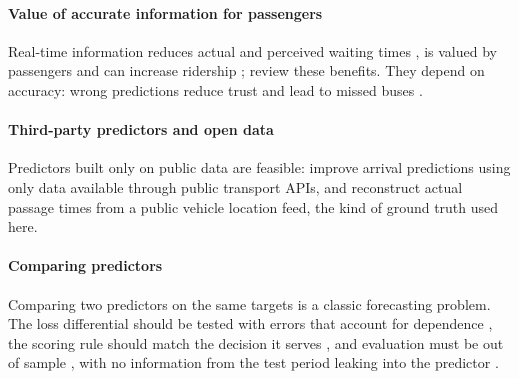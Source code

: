 \paragraph{Value of accurate information for passengers} Real-time information reduces actual and perceived waiting
times \parencite{watkins2011,dziekan2007dynamic,mishalani2006,liu2020waiting}, is valued by passengers
\parencite{ferris2010onebusaway,rahman2013users} and can increase ridership \parencite{tang2012chicago,brakewood2015nyc};
\textcite{brakewood2019} review these benefits. They depend on accuracy: wrong predictions reduce trust and lead to missed
buses \parencite{gooze2013benefits}.

\paragraph{Third-party predictors and open data} Predictors built only on public data are feasible:
\textcite{garciamaurino2024improving} improve arrival predictions using only data available through public transport
APIs, and \textcite{wessel2017retrospective} reconstruct actual passage times from a public vehicle location feed, the
kind of ground truth used here.

\paragraph{Comparing predictors} Comparing two predictors on the same targets is a classic forecasting problem. The loss
differential should be tested with errors that account for dependence \parencite{diebold1995comparing}, the scoring rule
should match the decision it serves \parencite{gneiting2011point}, and evaluation must be out of sample
\parencite{tashman2000outofsample}, with no information from the test period leaking into the predictor
\parencite{kaufman2012leakage}.
